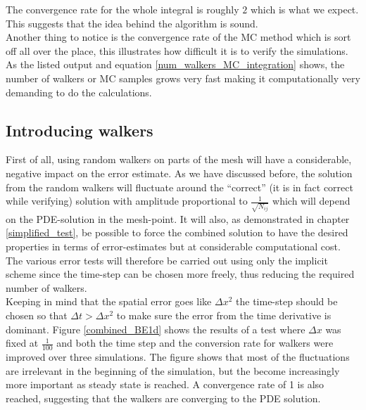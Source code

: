 The convergence rate for the whole integral is roughly $2$ which is what we expect. This suggests that the idea behind the algorithm is sound. \\
Another thing to notice is the convergence rate of the MC method which is sort off all over the place, this illustrates how difficult it is to verify the simulations. 
As the listed output and equation \eqref{num_walkers_MC_integration} shows, the number of walkers or MC samples grows very fast making it computationally very demanding to do the calculations.

\subsection{Introducing walkers}


First of all, using random walkers on parts of the mesh will have a considerable, negative impact on the error estimate. 
As we have discussed before, the solution from the random walkers will fluctuate around the ``correct'' (it is in fact correct while verifying) solution with amplitude proportional to $\frac{1}{\sqrt{N_{ij}}}$ which will depend on the PDE-solution in the mesh-point. 
It will also, as demonstrated in chapter \ref{simplified_test}, be possible to force the combined solution to have the desired properties in terms of error-estimates but at considerable computational cost. 
The various error tests will therefore be carried out using only the implicit scheme since the time-step can be chosen more freely, thus reducing the required number of walkers.\\
Keeping in mind that the spatial error goes like $\Delta x^2$ the time-step should be chosen so that $\Delta t> \Delta x^2$ to make sure the error from the time derivative is dominant. 
Figure \ref{combined_BE1d} shows the results of a test where $\Delta x$ was fixed at $\frac{1}{100}$ and both the time step and the conversion rate for walkers were improved over three simulations. 
The figure shows that most of the fluctuations are irrelevant in the beginning of the simulation, but the become increasingly more important as steady state is reached. 
A convergence rate of 1 is also reached, suggesting that the walkers are converging to the PDE solution. 


